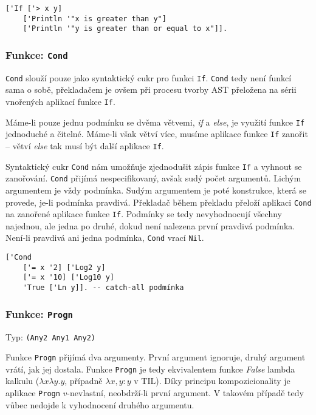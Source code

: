 \begin{lstlisting}[caption={Ukázka využití If}]
['If ['> x y]
    ['Println '"x is greater than y"]
    ['Println '"y is greater than or equal to x"]].
\end{lstlisting}

\subsubsection*{Funkce: \lstinline{Cond}}

\lstinline{Cond} slouží pouze jako syntaktický cukr pro funkci \lstinline{If}. \lstinline{Cond} tedy
není funkcí sama o sobě, překladačem je ovšem při procesu tvorby AST přeložena na sérii vnořených
aplikací funkce \lstinline{If}.

Máme-li pouze jednu podmínku se dvěma větvemi, \textit{if} a \textit{else}, je využití funkce
\lstinline{If} jednoduché a čitelné. Máme-li však větví více, musíme aplikace funkce \lstinline{If}
zanořit -- větví \textit{else} tak musí být další aplikace \lstinline{If}.

Syntaktický cukr \lstinline{Cond} nám umožňuje zjednodušit zápis funkce \lstinline{If} a vyhnout
se zanořování. \lstinline{Cond} přijímá nespecifikovaný, avšak sudý počet argumentů. Lichým
argumentem je vždy podmínka. Sudým argumentem je poté konstrukce, která se provede, je-li podmínka
pravdivá. Překladač během překladu přeloží aplikaci \lstinline{Cond} na zanořené aplikace funkce
\lstinline{If}. Podmínky se tedy nevyhodnocují všechny najednou, ale jedna po druhé, dokud není
nalezena první pravdivá podmínka. Není-li pravdivá ani jedna podmínka, \lstinline{Cond} vrací
\lstinline{Nil}.

\begin{lstlisting}[caption={Ukázka využití Cond}]
['Cond
    ['= x '2] ['Log2 y]
    ['= x '10] ['Log10 y]
    'True ['Ln y]]. -- catch-all podmínka
\end{lstlisting}

\subsubsection*{Funkce: \lstinline{Progn}}\label{progn-fn}
Typ: \lstinline{(Any2 Any1 Any2)}

Funkce \lstinline{Progn} přijímá dva argumenty. První argument ignoruje, druhý argument vrátí, jak
jej dostala. Funkce \lstinline{Progn} je tedy ekvivalentem funkce \textit{False} lambda kalkulu
($\lambda x \lambda y . y$, případně $\lambda x, y: y$ v TIL). Díky principu kompozicionality je aplikace
\lstinline{Progn} $v$-nevlastní, neobdrží-li první argument. V takovém případě tedy vůbec nedojde
k vyhodnocení druhého argumentu.

